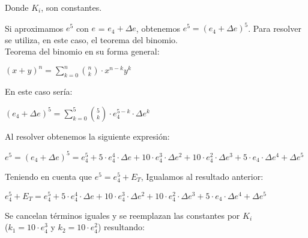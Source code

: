 \documentclass[]{article}
\begin{document}
\begin{flushleft}
		Donde $K_{i}$, son constantes. \\
\end{flushleft}
			
\begin{flushleft}
	Si aproximamos $e^{5}$ con $e$ = $e_{4} + \Delta{e}$, obtenemos $e^{5} = (e_{4} + \Delta{e})^{5}$. Para resolver se utiliza, en este caso, el teorema del binomio. \\
Teorema del binomio en su forma general: 
\end{flushleft}
\begin{center}
	$(x+y)^n = \displaystyle\sum_{k=0}^{n} {{n}\choose{k}} \cdot x^{n-k}y^k $

\end{center}

\begin{flushleft}
	En este caso sería:
\end{flushleft}

\begin{center}
	$(e_{4} + \Delta{e})^{5} = \displaystyle\sum_{k=0}^{5} {{5}\choose{k}} \cdot e_{4}^{5-k}\cdot\Delta e^k $
\end{center}

\begin{flushleft}
	Al resolver obtenemos la siguiente expresión: \\
\end{flushleft}
	
\begin{center}
$e^{5} = (e_{4} + \Delta{e})^{5} = e_{4}^{5} + 5\cdot{e^{4}_{4}}\cdot\Delta{e} + 10\cdot{e^{3}_{4}}\cdot\Delta{e^{2}} + 10\cdot{e^{2}_{4}}\cdot\Delta{e^{3}} +  5\cdot{e_{4}}\cdot\Delta{e^{4}} +  \Delta{e^{5}}$
\end{center}
	
\begin{flushleft}
	Teniendo en cuenta que $e^{5} = e^{5}_{4} + E_{T} $, Igualamos al resultado anterior: \\
\end{flushleft}
	
\begin{center}
$e^{5}_{4} + E_{T} = e_{4}^{5} + 5\cdot{e^{4}_{4}}\cdot\Delta{e} + 10\cdot{e^{3}_{4}}\cdot\Delta{e^{2}} + 10\cdot{e^{2}_{4}}\cdot\Delta{e^{3}} + 5\cdot{e_{4}}\cdot\Delta{e^{4}} + \Delta{e^{5}}$
\end{center}

\begin{flushleft}
	Se cancelan términos iguales y se reemplazan las constantes por $K_{i}$ \\ ($k_{1} = 10\cdot{e^{3}_{4}}$ y $k_{2} = 10\cdot{e^{2}_{4}}$) resultando:
\end{flushleft}
\end{document}
